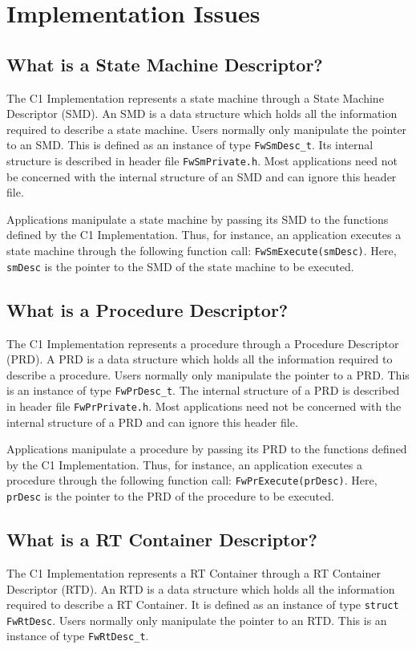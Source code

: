 \documentclass[faq]{../fwprofile}
\begin{document}
\section{Implementation Issues}

\subsection{What is a State Machine Descriptor?}\label{faq:SMD}
The C1 Implementation represents a state machine through a State Machine Descriptor (SMD). An SMD is a data structure which holds all the information 
required to describe a state machine. Users normally only manipulate the pointer to an SMD. This is defined as an instance of type \texttt{FwSmDesc\_t}. Its internal structure is described in header file \texttt{FwSmPrivate.h}. Most applications need not be concerned with the internal structure of an SMD and can ignore this header file.

Applications manipulate a state machine by passing its SMD to the functions defined by the C1 Implementation. Thus, for instance, an application executes 
a state machine through the following function call: \texttt{FwSmExecute(smDesc)}. Here, \texttt{smDesc} is the pointer to the SMD of the state machine to be executed.

\subsection{What is a Procedure Descriptor?}\label{faq:PRD}
The C1 Implementation represents a procedure through a Procedure Descriptor (PRD). A PRD is a data structure which holds all the information required 
to describe a procedure. Users normally only manipulate the pointer to a PRD. This is an instance of type \texttt{FwPrDesc\_t}. The internal structure of a PRD is described in header file \texttt{FwPrPrivate.h}. Most applications need not be concerned with the internal structure of a PRD and can ignore this header file.

Applications manipulate a procedure by passing its PRD to the functions defined by the C1 Implementation. Thus, for instance, an application executes 
a procedure through the following function call: \texttt{FwPrExecute(prDesc)}. Here, \texttt{prDesc} is the pointer to the PRD of the procedure to be executed.

\subsection{What is a RT Container Descriptor?}\label{faq:RTD}
The C1 Implementation represents a RT Container through a RT Container Descriptor (RTD). An RTD is a data structure which holds all the information required to describe a RT Container. It is defined as an instance of type \texttt{struct FwRtDesc}. Users normally only manipulate the pointer to an RTD. This is an instance of type \texttt{FwRtDesc\_t}. 
\end{document}
